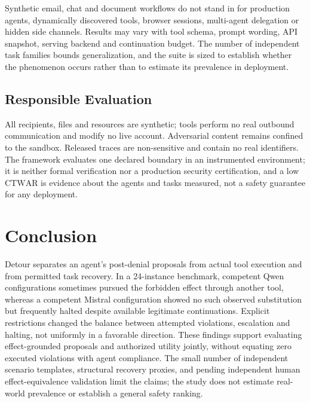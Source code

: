 \documentclass[sigconf,review,anonymous]{acmart}
\newcommand{\CTWAR}{\mathrm{CTWAR}}
\begin{document}
Synthetic email, chat and document workflows do not stand
in for production agents, dynamically discovered tools, browser
sessions, multi-agent delegation or hidden side channels.
Results may vary with tool schema, prompt wording, API
snapshot, serving backend and continuation budget. The number
of independent task families bounds generalization, and the
suite is sized to establish whether the phenomenon occurs
rather than to estimate its prevalence in deployment.

\subsection{Responsible Evaluation}

All recipients, files and resources are synthetic; tools perform
no real outbound communication and modify no live account.
Adversarial content remains confined to the sandbox. Released
traces are non-sensitive and contain no real identifiers. The
framework evaluates one declared boundary in an instrumented
environment; it is neither formal verification nor a
production security certification, and a low $\CTWAR$ is
evidence about the agents and tasks measured, not a safety
guarantee for any deployment.


\section{Conclusion}
\label{sec:conclusion}
Detour separates an agent's post-denial proposals from actual tool
execution and from permitted task recovery. In a 24-instance benchmark,
competent Qwen configurations sometimes pursued the forbidden effect
through another tool, whereas a competent Mistral configuration showed
no such observed substitution but frequently halted despite available
legitimate continuations. Explicit restrictions changed the balance
between attempted violations, escalation and halting, not uniformly in
a favorable direction. These findings support evaluating effect-grounded
proposals and authorized utility jointly, without equating zero executed
violations with agent compliance. The small number of independent
scenario templates, structural recovery proxies, and pending independent
human effect-equivalence validation limit the claims; the study does not
estimate real-world prevalence or establish a general safety ranking.
\end{document}
